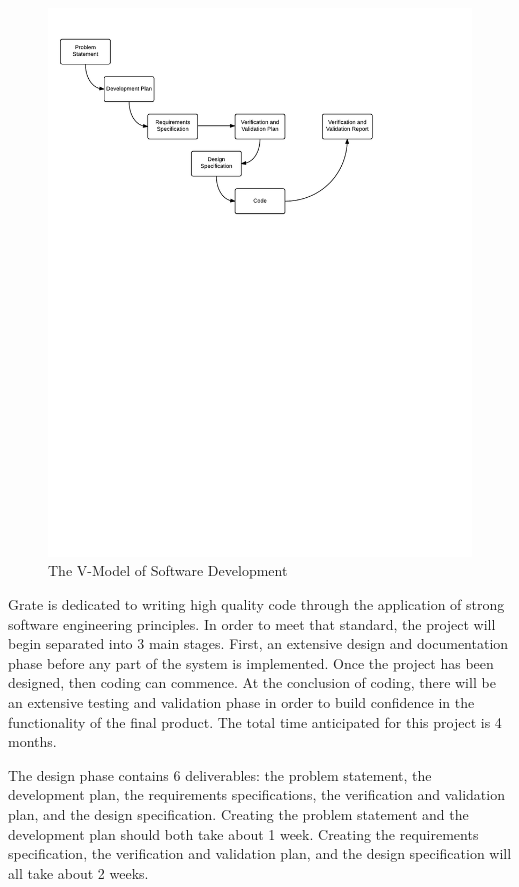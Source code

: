 \documentclass[12pt, titlepage]{article}
\begin{document}
\begin{figure}[h]
  \includegraphics[width=\linewidth]{OverviewOfProcess.pdf}
  \caption{The V-Model of Software Development}
\end{figure}

Grate is dedicated to writing high quality code through the application of 
strong software engineering principles. In order to meet that standard, the 
project will begin separated into 3 main stages. First, an extensive design and 
documentation phase before any part of the system is implemented. Once the 
project has been designed, then coding can commence. At the conclusion of 
coding, there will be an extensive testing and validation phase in order to 
build confidence in the functionality of the final product. The total time 
anticipated for this project is 4 months.

The design phase contains 6 deliverables: the problem statement, the development 
plan, the requirements specifications, the verification and validation plan, and 
the design specification. Creating the problem statement and the development 
plan should both take about 1 week. Creating the requirements specification, the 
verification and validation plan, and the design specification will all take 
about 2 weeks.
\end{document}
